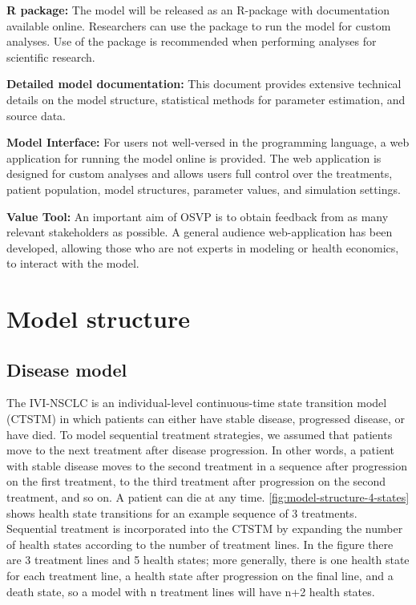 \documentclass[11pt,final,fleqn]{article}\usepackage[]{graphicx}\usepackage[]{color}
\theoremstyle{plain}
\begin{document}
{\textbf{R package:} The model will be released as an R-package with documentation available online. Researchers can use the package to run the model for custom analyses. Use of the package is recommended when performing analyses for scientific research.

\textbf{Detailed model documentation:} This document provides extensive technical details on the model structure, statistical methods for parameter estimation, and source data.

\textbf{Model Interface:} For users not well-versed in the programming language, a web application for running the model online is provided. The web application is designed for custom analyses and allows users full control over the treatments, patient population, model structures, parameter values, and simulation settings.

\textbf{Value Tool:} An important aim of OSVP is to obtain feedback from as many relevant stakeholders as possible. A general audience web-application has been developed, allowing those who are not experts in modeling or health economics, to interact with the model.

\section{Model structure}\label{sec:model-structure}

\subsection{Disease model}

The IVI-NSCLC is an individual-level continuous-time state transition model (CTSTM) in which patients can either have stable disease, progressed disease, or have died. To model sequential treatment strategies, we assumed that patients move to the next treatment after disease progression. In other words, a patient with stable disease moves to the second treatment in a sequence after progression on the first treatment, to the third treatment after progression on the second treatment, and so on. A patient can die at any time. \autoref{fig:model-structure-4-states} shows health state transitions for an example sequence of 3 treatments. Sequential treatment is incorporated into the CTSTM by expanding the number of health states according to the number of treatment lines. In the figure there are 3 treatment lines and 5 health states; more generally, there is one health state for each treatment line, a health state after progression on the final line, and a death state, so a model with n treatment lines will have n+2 health states. 

}
\end{document}
